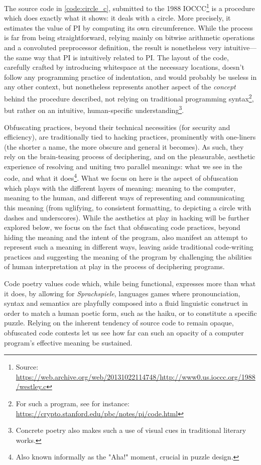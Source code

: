 The source code in \ref{code:circle_c}, submitted to the 1988 IOCCC\footnote{Source: \url{https://web.archive.org/web/20131022114748/http://www0.us.ioccc.org/1988/westley.c}} is a procedure which does exactly what it shows: it deals with a circle. More precisely, it estimates the value of PI by computing its own circumference. While the process is far from being straightforward, relying mainly on bitwise arithmetic operations and a convoluted preprocessor definition, the result is nonetheless very intuitive—the same way that PI is intuitively related to PI. The layout of the code, carefully crafted by introducing whitespace at the necessary locations, doesn't follow any programming practice of indentation, and would probably be useless in any other context, but nonetheless represents another aspect of the \emph{concept} behind the procedure described, not relying on traditional programming syntax\footnote{For such a program, see for instance: \url{https://crypto.stanford.edu/pbc/notes/pi/code.html}}, but rather on an intuitive, human-specific understanding\footnote{Concrete poetry also makes such a use of visual cues in traditional literary works.}.

Obfuscating practices, beyond their technical necessities (for security and efficiency), are traditionally tied to hacking practices, prominently with one-liners (the shorter a name, the more obscure and general it becomes). As such, they rely on the brain-teasing process of deciphering, and on the pleasurable, aesthetic experience of resolving and uniting two parallel meanings: what we see in the code, and what it does\footnote{Also known informally as the "Aha!" moment, crucial in puzzle design.}. What we focus on here is the aspect of obfuscation which plays with the different layers of meaning: meaning to the computer, meaning to the human, and different ways of representing and communicating this meaning (from uglifying, to consistent formatting, to depicting a circle with dashes and underscores). While the aesthetics at play in hacking will be further explored below, we focus on the fact that obfuscating code practices, beyond hiding the meaning and the intent of the program, also manifest an attempt to represent such a meaning in different ways, leaving aside traditional code-writing practices and suggesting the meaning of the program by challenging the abilities of human interpretation at play in the process of deciphering programs.

Code poetry values code which, while being functional, expresses more than what it does, by allowing for \emph{Sprachspiele}, languages games where pronounciation, syntax and semantics are playfully composed into a fluid linguistic construct in order to match a human poetic form, such as the haiku, or to constitute a specific puzzle. Relying on the inherent tendency of source code to remain opaque, obfuscated code contests let us see how far can such an opacity of a computer program's effective meaning be sustained.


